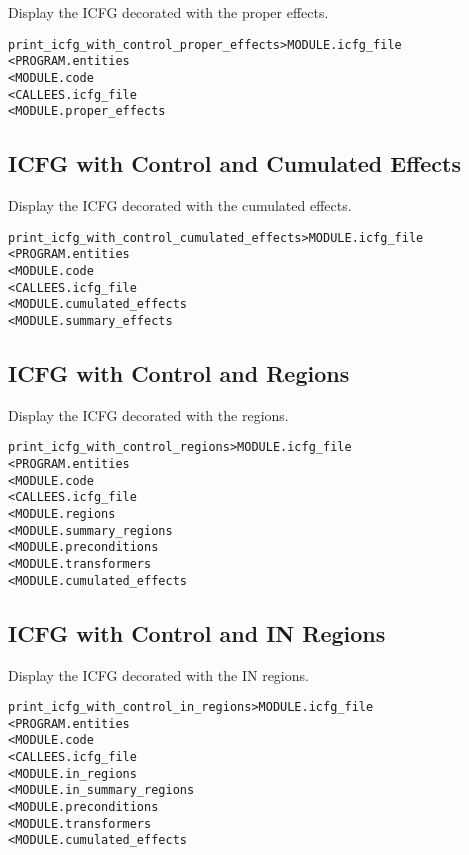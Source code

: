 \documentclass[a4paper]{report}
\newenvironment{PipsMake}{\begin{alltt}}{\end{alltt}}
\begin{document}
Display the ICFG decorated with the proper effects.
\begin{PipsMake}
print_icfg_with_control_proper_effects  > MODULE.icfg_file
        < PROGRAM.entities
        < MODULE.code
        < CALLEES.icfg_file
        < MODULE.proper_effects
\end{PipsMake}

\subsection{ICFG with Control and Cumulated Effects}

Display the ICFG decorated with the cumulated effects.
\begin{PipsMake}
print_icfg_with_control_cumulated_effects   > MODULE.icfg_file
        < PROGRAM.entities
        < MODULE.code
        < CALLEES.icfg_file
        < MODULE.cumulated_effects
        < MODULE.summary_effects
\end{PipsMake}

\subsection{ICFG with Control and Regions}

Display the ICFG decorated with the regions.
\begin{PipsMake}
print_icfg_with_control_regions         > MODULE.icfg_file
        < PROGRAM.entities
        < MODULE.code
        < CALLEES.icfg_file
        < MODULE.regions
        < MODULE.summary_regions
        < MODULE.preconditions
        < MODULE.transformers
        < MODULE.cumulated_effects
\end{PipsMake}

\subsection{ICFG with Control and IN Regions}

Display the ICFG decorated with the IN regions.
\begin{PipsMake}
print_icfg_with_control_in_regions      > MODULE.icfg_file
        < PROGRAM.entities
        < MODULE.code
        < CALLEES.icfg_file
        < MODULE.in_regions
        < MODULE.in_summary_regions
        < MODULE.preconditions
        < MODULE.transformers
        < MODULE.cumulated_effects
\end{PipsMake}
\end{document}

